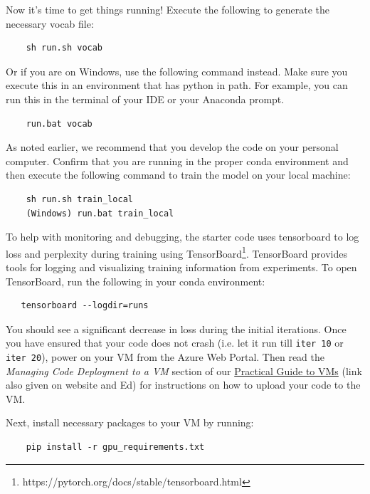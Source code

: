 Now it's time to get things running! Execute the following to generate the necessary vocab file:

\begin{lstlisting}
    sh run.sh vocab
\end{lstlisting}

Or if you are on Windows, use the following command instead. Make sure you execute this in an environment that has python in path. For example, you can run this in the terminal of your IDE or your Anaconda prompt.


\begin{lstlisting}
    run.bat vocab
\end{lstlisting}

As noted earlier, we recommend that you develop the code on your personal computer.  Confirm that you are running in the proper conda environment and then execute the following command to train the model on your local machine:
    
\begin{lstlisting}
    sh run.sh train_local
    (Windows) run.bat train_local
\end{lstlisting}

To help with monitoring and debugging, the starter code uses tensorboard to log loss and perplexity during training using TensorBoard\footnote{https://pytorch.org/docs/stable/tensorboard.html}. TensorBoard provides tools for logging and visualizing training information from experiments. To open TensorBoard, run the following in your conda environment:

\begin{lstlisting}
   tensorboard --logdir=runs
\end{lstlisting}

You should see a significant decrease in loss during the initial iterations. Once you have ensured that your code does not crash (i.e. let it run till \texttt{iter 10} or \texttt{iter 20}), power on your VM from the Azure Web Portal. Then read the \textit{Managing Code Deployment to a VM} section of our \href{https://docs.google.com/document/d/1jtANWXbIYXMZO_2X7jupauPxcEbz-TVJkdatg4gzOdk}{Practical Guide to VMs} (link also given on website and Ed) for instructions on how to upload your code to the VM.

Next, install necessary packages to your VM by running:
    
\begin{lstlisting}
    pip install -r gpu_requirements.txt
\end{lstlisting}

